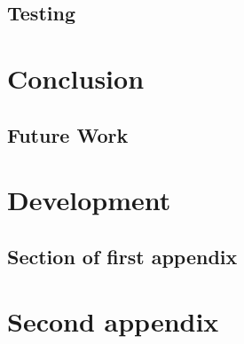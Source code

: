 \documentclass{mproj}
\begin{document}
\section{Testing}


\chapter{Conclusion}\label{conclusion}

\section{Future Work}

\appendix %
\chapter{Development}

\section{Section of first appendix}

\chapter{Second appendix}



\end{document}
